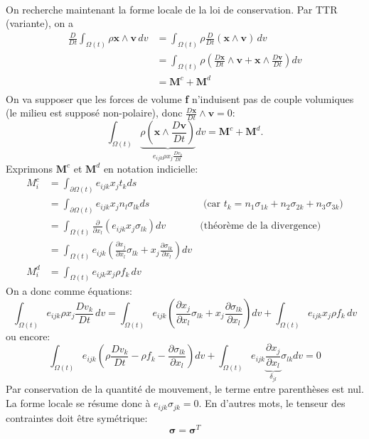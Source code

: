 \paragraph{}
On recherche maintenant la forme locale de la loi de conservation. Par TTR (variante), on a 
$$\begin{aligned}
\frac{D}{Dt}\int_{\Omega (t)}\rho\textbf{x}\wedge\textbf{v}\,dv &=\int_{\Omega (t)}\rho\frac{D}{Dt}(\textbf{x}\wedge\textbf{v})\,dv\\
 &=\int_{\Omega (t)}\rho \left(\frac{D\textbf{x}}{Dt}\wedge\textbf{v}+\textbf{x}\wedge\frac{D\textbf{v}}{Dt}\right)dv\\
  & =\textbf{M}^c+\textbf{M}^d\\
\end{aligned}$$
On va supposer que les forces de volume \textbf{f} n'induisent pas de couple volumiques (le milieu est supposé non-polaire), donc $\frac{D\textbf{x}}{Dt}\wedge\textbf{v}=0$:
$$\int_{\Omega (t)}\underbrace{\rho \left(\textbf{x}\wedge\frac{D\textbf{v}}{Dt}\right)}_{e_{ijk}\rho x_j\frac{Dv_k}{Dt}}dv=\textbf{M}^c+\textbf{M}^d.$$
Exprimons $\textbf{M}^c$ et $\textbf{M}^d$ en notation indicielle:
$$\begin{aligned}
M_i^c&=\int_{\partial\Omega (t)}e_{ijk}x_jt_kds\\
 & =\int_{\partial\Omega (t)}e_{ijk}x_jn_l\sigma_{lk}ds & \text{  (car } t_k=n_1\sigma_{1k}+n_2\sigma_{2k}+n_3\sigma_{3k}\text{)}\\
 &=\int_{\Omega (t)}\frac{\partial}{\partial x_l}(e_{ijk}x_j\sigma_{lk})dv& \text{(théorème de la divergence)}\\
 &=\int_{\Omega (t)}e_{ijk}\left(\frac{\partial x_j}{\partial x_l}\sigma_{lk}+x_j\frac{\partial\sigma_{lk}}{\partial x_l}\right)dv\\
 M_i^d&=\int_{\Omega (t)}e_{ijk}x_j\rho f_k\,dv
\end{aligned}$$
On a donc comme équations: 
$$\int_{\Omega (t)}e_{ijk}\rho x_j\frac{Dv_k}{Dt}\,dv=\int_{\Omega (t)}e_{ijk}\left(\frac{\partial x_j}{\partial x_l}\sigma_{lk}+x_j\frac{\partial\sigma_{lk}}{\partial x_l}\right)dv+\int_{\Omega (t)}e_{ijk}x_j\rho f_k\,dv$$
ou encore:
$$\int_{\Omega (t)}e_{ijk}\left(\rho\frac{Dv_k}{Dt}-\rho f_k-\frac{\partial \sigma_{lk}}{\partial x_l}\right)dv+\int_{\Omega (t)}e_{ijk}\underbrace{\frac{\partial x_j}{\partial x_l}}_{\delta_{jl}}\sigma_{lk}dv=0$$
Par conservation de la quantité de mouvement, le terme entre parenthèses est nul. La forme locale se résume donc à $e_{ijk}\sigma_{jk}=0$. En d'autres mots, le tenseur des contraintes doit être symétrique:
$$\boxed{\boldsymbol{\sigma}=\boldsymbol{\sigma}^T}$$

